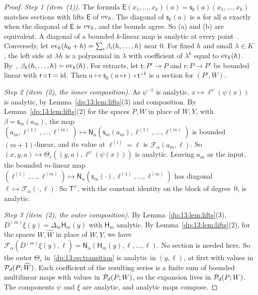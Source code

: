 \begin{proof}
\emph{Step 1 (item~(1)).} The formula $\mathsf E(x_1,\dots,x_k)(a)=\mathsf s_k(a)(x_1,\dots,x_k)$ matches sections with lifts $\mathsf E$ of $\operatorname{ev}_k$. The diagonal of $\mathsf s_k(a)$ is $a$ for all $a$ exactly when the diagonal of $\mathsf E$ is $\operatorname{ev}_k$, and the bounds agree. So (a) and (b) are equivalent. A diagonal of a bounded $k$-linear map is analytic at every point~\cite[Proposition~2.5]{I}. Conversely, let $\operatorname{ev}_k(h_0+h)=\sum_i\beta_i(h,\dots,h)$ near $0$. For fixed $h$ and small $\lambda\in K$, the left side at $\lambda h$ is a polynomial in $\lambda$ with coefficient of $\lambda^k$ equal to $\operatorname{ev}_k(h)$. By~\cite[Lemma~A.1]{I}, $\beta_k(h,\dots,h)=\operatorname{ev}_k(h)$. For retracts, let $\mathsf t\colon P'\to P$ and $\mathsf r\colon P\to P'$ be bounded linear with $\mathsf r\circ\mathsf t=\mathrm{id}$. Then $a\mapsto\mathsf s_k(a\circ\mathsf r)\circ\mathsf t^{\times k}$ is a section for $(P',W)$.

\emph{Step 2 (item~(2), the inner composition).} As $\psi^{-1}$ is analytic, $x\mapsto\ell^\psi(\psi(x))$ is analytic, by Lemma~\ref{dp:13:lem:lifts}(3) and composition. By Lemma~\ref{dp:13:lem:lifts}(2) for the spaces $P,W$ in place of $W,Y$, with $\beta=\mathsf s_m(a_m)$, the map $(a_m,\ell^{(1)},\dots,\ell^{(m)})\mapsto\mathsf N_\alpha(\mathsf s_m(a_m),\ell^{(1)},\dots,\ell^{(m)})$ is bounded $(m+1)$-linear, and its value at $\ell^{(i)}=\ell$ is $\mathcal F_\alpha(a_m,\ell)$. So $(x,y,a)\mapsto\Theta_r((y,a),\ell^\psi(\psi(x)))$ is analytic. Leaving $a_m$ as the input, the bounded $m$-linear map $(\ell^{(1)},\dots,\ell^{(m)})\mapsto\mathsf N_\alpha(\mathsf s_m({\cdot}),\ell^{(1)},\dots,\ell^{(m)})$ has diagonal $\ell\mapsto\mathcal F_\alpha({\cdot},\ell)$. So $\mathsf T^\psi$, with the constant identity on the block of degree~$0$, is analytic.

\emph{Step 3 (item~(2), the outer composition).} By Lemma~\ref{dp:13:lem:lifts}(3), $D^{(m)}\xi(y)=\Delta_m\mathsf H_m(y)$ with $\mathsf H_m$ analytic. By Lemma~\ref{dp:13:lem:lifts}(2), for the spaces $W,\widehat W$ in place of $W,Y$, we have $\mathcal F_\alpha(D^{(m)}\xi(y),\ell)=\mathsf N_\alpha(\mathsf H_m(y),\ell,\dots,\ell)$. No section is needed here. So the outer $\Theta_r$ in~\eqref{dp:13:eq:transition} is analytic in $(y,\ell)$, at first with values in $\mathcal P_d(P;\widehat W)$. Each coefficient of the resulting series is a finite sum of bounded multilinear maps with values in $\mathcal P_d(P;W)$, so the expansion lives in $\mathcal P_d(P;W)$. The components $\psi$ and $\xi$ are analytic, and analytic maps compose.


\end{proof}
